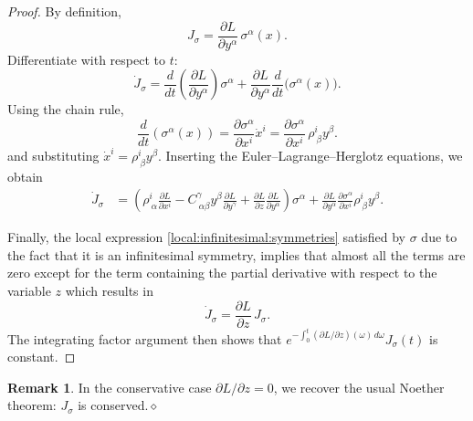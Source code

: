 \documentclass[11pt,a4paper]{article}
\theoremstyle{definition}
\newtheorem{remark}[theorem]{Remark}
\begin{document}
\begin{proof}
By definition,
\[
J_\sigma = \frac{\partial L}{\partial y^\alpha}\,\sigma^\alpha(x).
\]
Differentiate with respect to $t$:
\[
\dot J_\sigma
= \frac{d}{dt}\left(\frac{\partial L}{\partial y^\alpha}\right)\sigma^\alpha
+ \frac{\partial L}{\partial y^\alpha}\frac{d}{dt}\big(\sigma^\alpha(x)\big).
\]
Using the chain rule,
\[
\frac{d}{dt}(\sigma^\alpha(x)) = 
\frac{\partial \sigma^\alpha}{\partial x^i} \dot x^i
= \frac{\partial \sigma^\alpha}{\partial x^i}\,\rho^i_{\ \beta}y^\beta.
\]
and substituting $\dot x^i=\rho^i_{\ \beta}y^\beta$. Inserting the Euler--Lagrange--Herglotz equations, we obtain
\begin{align*}
\dot J_\sigma
&= \left(
\rho^i_{\ \alpha}\frac{\partial L}{\partial x^i}
- C^\gamma_{\ \alpha\beta}y^\beta \frac{\partial L}{\partial y^\gamma}
+ \frac{\partial L}{\partial z}\frac{\partial L}{\partial y^\alpha}
\right)\sigma^\alpha
+ \frac{\partial L}{\partial y^\alpha}\frac{\partial \sigma^\alpha}{\partial x^i}
\rho^i_{\ \beta}y^\beta.
\end{align*}

Finally, the local expression \eqref{local:infinitesimal:symmetries} satisfied by $\sigma$ due to the fact that it is an infinitesimal symmetry, implies that almost all the terms are zero except for the term containing the partial derivative with respect to the variable $z$ which results in
\[
\dot J_\sigma = \frac{\partial L}{\partial z}\,J_\sigma.
\]
The integrating factor argument then shows that
$e^{-\int_0^t (\partial L/\partial z)(\omega)\,d\omega} J_\sigma(t)$
is constant.
\end{proof}

\begin{remark}
In the conservative case $\partial L/\partial z=0$, we recover the usual
Noether theorem: $J_\sigma$ is conserved.\hfill$\diamond$ %
\end{remark}
\end{document}
